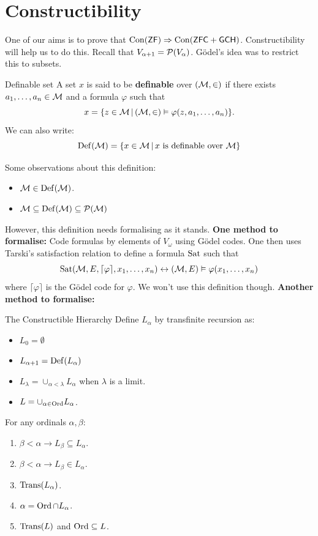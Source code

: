 \documentclass{article}
\begin{document}
\section{Constructibility}
One of our aims is to prove that $\operatorname{Con}(\mathsf{ZF}) \Rightarrow \operatorname{Con}(\mathsf{ZFC} + \mathsf{GCH})$. Constructibility will help us to do this. \gap
Recall that $V_{\alpha+1} = \mathcal{P}(V_{\alpha})$. G\"odel's idea was to restrict this to  subsets.
\begin{fancydefine}{Definable set}
    A set $x$ is said to be \textbf{definable} over $(\mathcal{M}, \in)$ if there exists $a_{1}, \dots, a_{n} \in \mathcal{M}$ and a formula $\varphi$ such that \[ x = \{ z \in \mathcal{M} \, | \, (\mathcal{M}, \in) \vDash \varphi(z,a_{1}, \dots, a_{n})\}.\]
    We can also write: \[ \operatorname{Def}(\mathcal{M}) = \{ x \in \mathcal{M} \, | \, x \text{ is definable over } \mathcal{M}\}\]
\end{fancydefine}
Some observations about this definition:
\begin{itemize}
    \item $\mathcal{M} \in \operatorname{Def}(\mathcal{M})$.
    \item $\mathcal{M} \subseteq \operatorname{Def}(\mathcal{M}) \subseteq \mathcal{P}(\mathcal{M})$
\end{itemize}
However, this definition needs formalising as it stands.
\gap
\textbf{One method to formalise:} Code formulas by elements of $V_{\omega}$ using G\"odel codes. One then uses Tarski's satisfaction relation to define a formula $\operatorname{Sat}$ such that \[ \operatorname{Sat}(\mathcal{M},E, \lceil \varphi \rceil, x_{1}, \dots, x_{n}) \leftrightarrow (\mathcal{M}, E) \vDash \varphi(x_{1},\dots,x_{n})\]
where $\lceil \varphi \rceil$ is the G\"odel code for $\varphi$. We won't use this definition though.\gap
\textbf{Another method to formalise:} \begin{fancydefine}{The Constructible Hierarchy}
    Define $L_{\alpha}$ by transfinite recursion as: \begin{itemize}
        \item $L_{0} = \emptyset$
        \item $L_{\alpha+1} = \operatorname{Def}(L_{\alpha})$
        \item $L_{\lambda} = \cup_{\alpha < \lambda} L_{\alpha}$ when $\lambda$ is a limit.
        \item $L = \cup_{\alpha \in \operatorname{Ord}} L_{\alpha}$.
    \end{itemize}
\end{fancydefine}
\begin{fancylem}{}
    For any ordinals $\alpha, \beta$: \begin{enumerate}
        \item[(i)] $\beta < \alpha \rightarrow L_{\beta} \subseteq L_{\alpha}$.
        \item[(ii)] $\beta < \alpha \rightarrow L_{\beta} \in L_{\alpha}$.
        \item[(iii)] $\operatorname{Trans}(L_{\alpha})$.
        \item[(iv)] $\alpha = \operatorname{Ord} \cap L_{\alpha}$.
        \item[(v)] $\operatorname{Trans}(L)$ and $\operatorname{Ord} \subseteq L$.
    \end{enumerate}
\end{fancylem}
\end{document}
